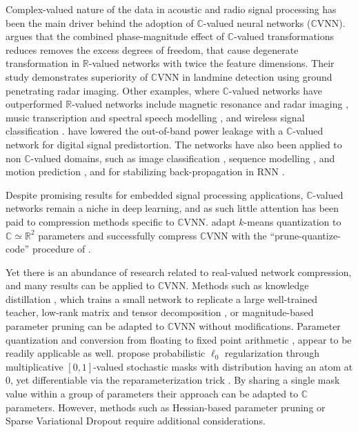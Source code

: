\documentclass[a4paper,10pt,twocolumn]{article}
\newcommand{\real}{\mathbb{R}}
\newcommand{\cplx}{\mathbb{C}}
\begin{document}
Complex-valued nature of the data in acoustic and radio signal processing has been
the main driver behind the adoption of $\cplx$-valued neural networks ($\cplx$VNN).
\citet{hirose_complex-valued_2009} argues that the combined phase-magnitude effect of
$\cplx$-valued transformations reduces removes the excess degrees of freedom, that cause
degenerate transformation in $\real$-valued networks with twice the feature dimensions.
Their study demonstrates superiority of $\cplx$VNN in landmine detection using ground
penetrating radar imaging. Other examples, where $\cplx$-valued networks have outperformed
$\real$-valued networks include magnetic resonance \citep{hui_mri_1995,wang_deepcomplexmri_2020}
and radar imaging \citep{haensch_complex-valued_2010,zhang_complex-valued_2017}, music
transcription and spectral speech modelling \citep{wisdom_full-capacity_2016,trabelsi_deep_2018},
and wireless signal classification \citep{yang_complex_2019}. \citet{tarver_design_2019}
have lowered the out-of-band power leakage with a $\cplx$-valued network for digital
signal predistortion. The networks have also been applied to non $\cplx$-valued domains,
such as image classification \citep{popa_complex-valued_2017}, sequence modelling
\citep{danihelka_associative_2016}, and motion prediction \citep{wolter_complex_2018},
and for stabilizing back-propagation in RNN \citep{wisdom_full-capacity_2016}.

Despite promising results for embedded signal processing applications, $\cplx$-valued
networks remain a niche in deep learning, and as such little attention has been paid
to compression methods specific to $\cplx$VNN. \citet{wu_compressing_2019} adapt $k$-means
quantization to $\cplx \simeq \real^2$ parameters and successfully compress $\cplx$VNN
with the ``prune-quantize-code'' procedure of \citet{han_deep_2016}.

Yet there is an abundance of research related to real-valued network compression, and
many results can be applied to $\cplx$VNN. Methods such as knowledge distillation
\citep{hinton_distilling_2015}, which trains a small network to replicate a large
well-trained teacher, low-rank matrix \citep{denton_exploiting_2014} and tensor decomposition
\citep{novikov_tensorizing_2015}, or magnitude-based parameter pruning \citep{zhu_prune_2018}
can be adapted to $\cplx$VNN without modifications. Parameter quantization and conversion
from floating to fixed point arithmetic \citep{courbariaux_training_2015,uhlich_mixed_2020},
appear to be readily applicable as well. \citet{louizos_learning_2018} propose probabilistic
$\ell_0$ regularization through multiplicative $[0, 1]$-valued stochastic masks with
distribution having an atom at $0$, yet differentiable via the reparameterization trick
\citep{kingma_auto-encoding_2014}. By sharing a single mask value within a group of
parameters their approach can be adapted to $\cplx$ parameters. However, methods such
as Hessian-based parameter pruning \citep{lecun_optimal_1990} or Sparse Variational Dropout
\citep{molchanov_variational_2017} require additional considerations.
\end{document}

